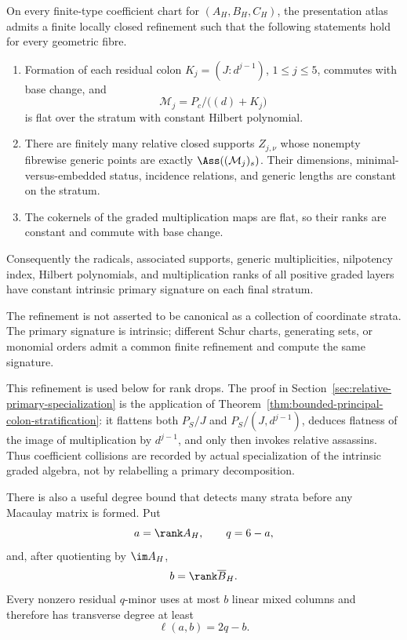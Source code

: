 \begin{proposition}
\label{prop:associated-prime-refinement}
On every finite-type coefficient chart for
\((A_H,B_H,C_H)\), the presentation atlas admits a finite locally
closed refinement such that the following statements hold for every
geometric fibre.
\begin{enumerate}
\item Formation of each residual colon
\(K_j=(J:d^{j-1})\), \(1\le j\le5\), commutes with base change,
and
\[
 \mathcal M_j=P_c/\bigl((d)+K_j\bigr)
\]
is flat over the stratum with constant Hilbert polynomial.
\item There are finitely many relative closed supports
\(Z_{j,\nu}\) whose nonempty fibrewise generic points are exactly
\(\Ass((\mathcal M_j)_s)\).  Their dimensions,
minimal-versus-embedded status, incidence relations, and generic
lengths are constant on the stratum.
\item The cokernels of the graded multiplication maps are flat, so
their ranks are constant and commute with base change.
\end{enumerate}
Consequently the radicals, associated supports, generic
multiplicities, nilpotency index, Hilbert polynomials, and
multiplication ranks of all positive graded layers have constant
intrinsic primary signature on each final stratum.

The refinement is not asserted to be canonical as a collection of
coordinate strata.  The primary signature is intrinsic; different
Schur charts, generating sets, or monomial orders admit a common
finite refinement and compute the same signature.
\end{proposition}

This refinement is used below for rank drops.  The proof in
Section~\ref{sec:relative-primary-specialization} is the application of
Theorem~\ref{thm:bounded-principal-colon-stratification}: it flattens
both \(P_S/J\) and \(P_S/(J,d^{j-1})\), deduces flatness of the image
of multiplication by \(d^{j-1}\), and only then invokes relative
assassins.  Thus coefficient collisions are
recorded by actual specialization of the intrinsic graded algebra,
not by relabelling a primary decomposition.

There is also a useful degree bound that detects many strata before
any Macaulay matrix is formed.  Put
\[
 a=\rank A_H,\qquad q=6-a,
\]
and, after quotienting by \(\im A_H\),
\[
 b=\rank\overline B_H.
\]
Every nonzero residual \(q\)-minor uses at most \(b\) linear mixed
columns and therefore has transverse degree at least
\begin{equation}\label{eq:minimal-transverse-degree}
 \ell(a,b)=2q-b.
\end{equation}

